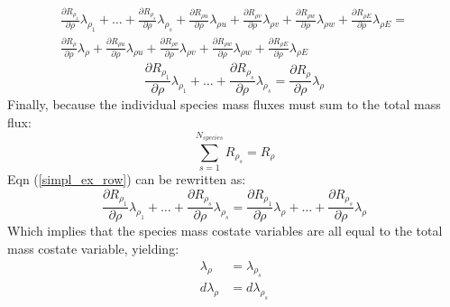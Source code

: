 \documentclass[10pt]{article}
\begin{document}
\begin{multline}
  \frac{\partial R_{\rho_1}}{\partial \rho}\lambda_{\rho_1} +
  \dots +
  \frac{\partial R_{\rho_s}}{\partial \rho}\lambda_{\rho_s} +
  \frac{\partial R_{\rho u}}{\partial \rho}\lambda_{\rho u} +
  \frac{\partial R_{\rho v}}{\partial \rho}\lambda_{\rho v} +
  \frac{\partial R_{\rho w}}{\partial \rho}\lambda_{\rho w} +
  \frac{\partial R_{\rho E}}{\partial \rho}\lambda_{\rho E} = \\
  \frac{\partial R_{\rho}}{\partial \rho}\lambda_{\rho} +
  \frac{\partial R_{\rho u}}{\partial \rho}\lambda_{\rho u} +
  \frac{\partial R_{\rho v}}{\partial \rho}\lambda_{\rho v} +
  \frac{\partial R_{\rho w}}{\partial \rho}\lambda_{\rho w} +
  \frac{\partial R_{\rho E}}{\partial \rho}\lambda_{\rho E}
  \label{expand_row}
\end{multline}
\begin{equation}
  \frac{\partial R_{\rho_1}}{\partial \rho}\lambda_{\rho_1} +
  \dots +
  \frac{\partial R_{\rho_s}}{\partial \rho}\lambda_{\rho_s} =
  \frac{\partial R_{\rho}}{\partial \rho}\lambda_{\rho}
  \label{simpl_ex_row}
\end{equation}
Finally, because the individual species mass fluxes must sum to the total mass flux:
\begin{equation}
  \sum_{s=1}^{N_{species}}{R_{\rho_s}} = R_{\rho}
  \label{sp_sum}
\end{equation}
Eqn (\ref{simpl_ex_row}) can be rewritten as:
\begin{equation}
  \frac{\partial R_{\rho_1}}{\partial \rho}\lambda_{\rho_1} +
  \dots +
  \frac{\partial R_{\rho_s}}{\partial \rho}\lambda_{\rho_s} =
  \frac{\partial R_{\rho_1}}{\partial \rho}\lambda_{\rho} +
  \dots +
  \frac{\partial R_{\rho_s}}{\partial \rho}\lambda_{\rho}
  \label{near_final}
\end{equation}
Which implies that the species mass costate variables are all equal to the total mass costate variable, yielding:
\begin{align}
  \lambda_{\rho} &= \lambda_{\rho_s} \\
  d \lambda_{\rho} &= d \lambda_{\rho_s}
  \label{final_result}
\end{align}
\end{document}
